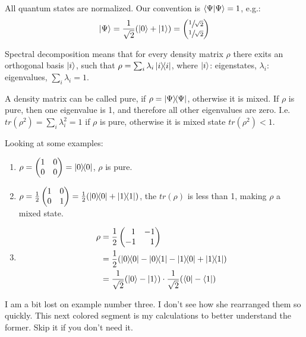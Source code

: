 All quantum states are normalized. Our convention is $\braket{\Psi}{\Psi} = 1$, e.g.:
$$
\ket{\Psi} = \frac{1}{\sqrt{2}} (\ket{0} + \ket{1}) = \begin{pmatrix}
\sfrac{1}{\sqrt{2}} \\
\sfrac{1}{\sqrt{2}}
\end{pmatrix}
$$

Spectral decomposition means that for every density matrix $\rho$ there exits an orthogonal basis ${\ket{i}}$, such that $\rho =\sum_i\lambda_i \ketbra{i}{i}$, where $\ket{i}$: eigenstates, $\lambda_i$: eigenvalues, $\sum_i \lambda_i = 1$.

A density matrix can be called pure, if $\rho = \ketbra{\Psi}{\Psi}$, otherwise it is mixed. If $\rho$ is pure, then one eigenvalue is 1, and therefore all other eigenvalues are zero. I.e. $tr(\rho^2) = \sum_i \lambda_i^2 = 1$ if $\rho$ is pure, otherwise it is mixed state $tr(\rho^2) < 1$.

Looking at some examples: 
\begin{enumerate}
    \item $\rho = \begin{pmatrix}
    1 & 0 \\
    0 & 0 
    \end{pmatrix} = \ketbra{0}{0}$, $\rho$ is pure.
    
    \item $\rho = \frac{1}{2}\begin{pmatrix}
    1 & 0\\
    0 & 1
    \end{pmatrix} = \frac{1}{2}(\ketbra{0}{0} + \ketbra{1}{1})$, the $tr(\rho)$ is less than 1,  making $\rho$ a mixed state.
    
    \item \begin{align*}
            \rho &= \frac{1}{2} \begin{pmatrix}
            \ \ 1 & -1 \\
            -1 & \ \ 1
            \end{pmatrix}\\ &= \frac{1}{2} (\ketbra{0}{0} - \ketbra{0}{1} -     \ketbra{1}{0} + \ketbra{1}{1}) \\ &=     \frac{1}{\sqrt{2}}(\ket{0}-\ket{1})\cdot \frac{1}{\sqrt{2}}(\bra{0}-\bra{1})
        \end{align*}
\end{enumerate}

I am a bit lost on example number three. I don't see how she rearranged them so quickly. This next colored segment is my calculations to better understand the former. Skip it if you don't need it.

